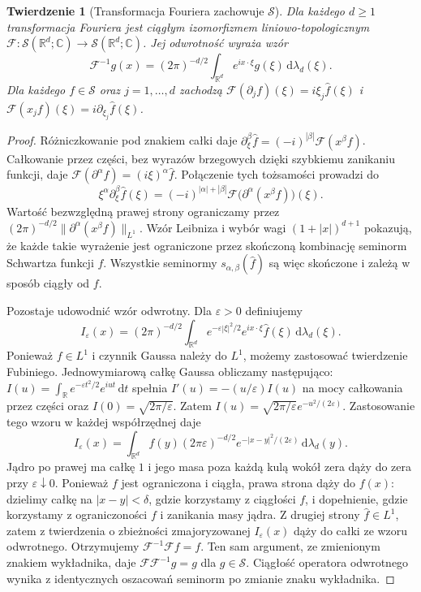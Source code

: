 \documentclass[11pt,a4paper]{article}
\numberwithin{equation}{section}
\theoremstyle{plain}
\newtheorem{twierdzenie}{Twierdzenie}[section]
\theoremstyle{definition}
\theoremstyle{remark}
\newcommand{\R}{\mathbb R}
\newcommand{\C}{\mathbb C}
\begin{document}
\begin{twierdzenie}[Transformacja Fouriera zachowuje $\mathcal S$]
\label{thm:fourier-schwartz17}
Dla każdego $d\ge1$ transformacja Fouriera jest ciągłym
izomorfizmem liniowo-topologicznym
$\mathcal F:\mathcal S(\R^d;\C)\to\mathcal S(\R^d;\C)$.
Jej odwrotność wyraża wzór
\[
\mathcal F^{-1}g(x)=(2\pi)^{-d/2}
\int_{\R^d}e^{ix\cdot\xi}g(\xi)\,
\mathrm d\lambda_d(\xi).
\]
Dla każdego $f\in\mathcal S$ oraz $j=1,\dots,d$ zachodzą
$\mathcal F(\partial_jf)(\xi)=i\xi_j\widehat f(\xi)$
i $\mathcal F(x_jf)(\xi)=i\partial_{\xi_j}\widehat f(\xi)$.
\end{twierdzenie}
\begin{proof}
Różniczkowanie pod znakiem całki daje
$\partial_\xi^\beta\widehat f=(-i)^{|\beta|}
\mathcal F(x^\beta f)$. Całkowanie przez części, bez wyrazów
brzegowych dzięki szybkiemu zanikaniu funkcji, daje
$\mathcal F(\partial^\alpha f)=(i\xi)^\alpha\widehat f$.
Połączenie tych tożsamości prowadzi do
\[
\xi^\alpha\partial_\xi^\beta\widehat f(\xi)
=(-i)^{|\alpha|+|\beta|}
\mathcal F\bigl(\partial^\alpha(x^\beta f)\bigr)(\xi).
\]
Wartość bezwzględną prawej strony ograniczamy przez
$(2\pi)^{-d/2}\|\partial^\alpha(x^\beta f)\|_{L^1}$.
Wzór Leibniza i wybór wagi $(1+|x|)^{d+1}$ pokazują,
że każde takie wyrażenie jest ograniczone przez skończoną
kombinację seminorm Schwartza funkcji $f$.
Wszystkie seminormy $s_{\alpha,\beta}(\widehat f)$ są więc
skończone i zależą w sposób ciągły od $f$.

Pozostaje udowodnić wzór odwrotny. Dla $\varepsilon>0$ definiujemy
\[
I_\varepsilon(x)=(2\pi)^{-d/2}\int_{\R^d}
 e^{-\varepsilon|\xi|^2/2}e^{ix\cdot\xi}
 \widehat f(\xi)\,\mathrm d\lambda_d(\xi).
\]
Ponieważ $f\in L^1$ i czynnik Gaussa należy do $L^1$,
możemy zastosować twierdzenie Fubiniego. Jednowymiarową całkę Gaussa obliczamy następująco:
$I(u)=\int_\R e^{-\varepsilon t^2/2}e^{iut}\,\mathrm dt$
spełnia $I'(u)=-(u/\varepsilon)I(u)$ na mocy całkowania
przez części oraz $I(0)=\sqrt{2\pi/\varepsilon}$.
Zatem $I(u)=\sqrt{2\pi/\varepsilon}e^{-u^2/(2\varepsilon)}$.
Zastosowanie tego wzoru w każdej współrzędnej daje
\[
I_\varepsilon(x)=\int_{\R^d}f(y)
(2\pi\varepsilon)^{-d/2}e^{-|x-y|^2/(2\varepsilon)}
\,\mathrm d\lambda_d(y).
\]
Jądro po prawej ma całkę $1$ i jego masa poza każdą
kulą wokół zera dąży do zera przy $\varepsilon\downarrow0$.
Ponieważ $f$ jest ograniczona i ciągła, prawa strona
dąży do $f(x)$: dzielimy całkę na $|x-y|<\delta$,
gdzie korzystamy z ciągłości $f$, i dopełnienie,
gdzie korzystamy z ograniczoności $f$ i zanikania masy jądra.
Z drugiej strony $\widehat f\in L^1$, zatem
z twierdzenia o zbieżności zmajoryzowanej
$I_\varepsilon(x)$ dąży do całki ze wzoru odwrotnego.
Otrzymujemy $\mathcal F^{-1}\mathcal Ff=f$.
Ten sam argument, ze zmienionym znakiem wykładnika,
daje $\mathcal F\mathcal F^{-1}g=g$ dla $g\in\mathcal S$.
Ciągłość operatora odwrotnego wynika z identycznych
oszacowań seminorm po zmianie znaku wykładnika.
\end{proof}
\end{document}
